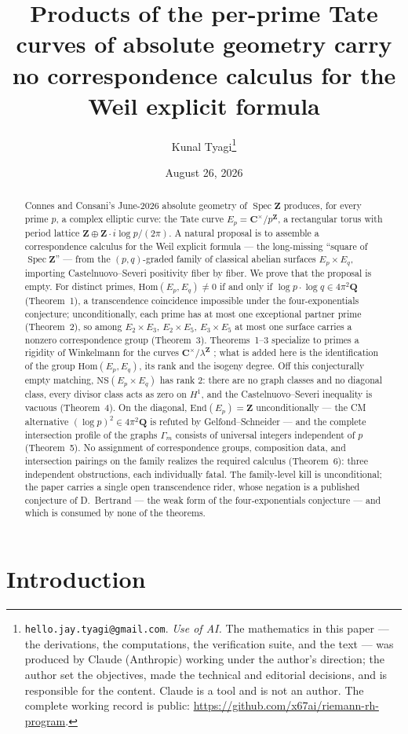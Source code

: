 \documentclass[11pt]{article}
\title{Products of the per-prime Tate curves of absolute geometry carry no
correspondence calculus for the Weil explicit formula}
\author{Kunal Tyagi\thanks{%
\texttt{hello.jay.tyagi@gmail.com}. \emph{Use of AI.} The mathematics in this
paper --- the derivations, the computations, the verification suite, and the
text --- was produced by Claude (Anthropic) working under the author's
direction; the author set the objectives, made the technical and editorial
decisions, and is responsible for the content. Claude is a tool and is not an
author. The complete working record is public:
\url{https://github.com/x67ai/riemann-rh-program}.}}
\date{August 26, 2026}
\theoremstyle{definition}
\theoremstyle{remark}
\newcommand{\Z}{\mathbf{Z}}
\newcommand{\Q}{\mathbf{Q}}
\newcommand{\C}{\mathbf{C}}
\newcommand{\NS}{\mathrm{NS}}
\newcommand{\Hom}{\mathrm{Hom}}
\newcommand{\End}{\mathrm{End}}
\newcommand{\SpecZ}{\operatorname{Spec}\Z}
\begin{document}
\maketitle

\begin{abstract}
Connes and Consani's June-2026 absolute geometry of $\SpecZ$ produces, for
every prime $p$, a complex elliptic curve: the Tate curve
$E_p = \C^\times/p^{\Z}$, a rectangular torus with period lattice
$\Z \oplus \Z\cdot i\log p/(2\pi)$. A natural proposal is to assemble a
correspondence calculus for the Weil explicit formula --- the long-missing
``square of $\SpecZ$'' --- from the $(p,q)$-graded family of classical abelian
surfaces $E_p \times E_q$, importing Castelnuovo--Severi positivity fiber by
fiber. We prove that the proposal is empty. For distinct primes,
$\Hom(E_p, E_q) \neq 0$ if and only if $\log p \cdot \log q \in 4\pi^2\Q$
(Theorem~1), a transcendence coincidence impossible under the
four-exponentials conjecture; unconditionally, each prime has at most one
exceptional partner prime (Theorem~2), so among $E_2\times E_3$,
$E_2\times E_5$, $E_3\times E_5$ at most one surface carries a nonzero
correspondence group (Theorem~3). Theorems~1--3 specialize to primes a
rigidity of Winkelmann for the curves $\C^\times/\lambda^{\Z}$ \cite{Wi04};
what is added here is the identification of the group $\Hom(E_p, E_q)$, its
rank and the isogeny degree. Off this conjecturally empty matching,
$\NS(E_p \times E_q)$ has rank $2$: there are no graph classes and no diagonal
class, every divisor class acts as zero on $H^1$, and the
Castelnuovo--Severi inequality is vacuous (Theorem~4). On the diagonal,
$\End(E_p) = \Z$ unconditionally --- the CM alternative
$(\log p)^2 \in 4\pi^2\Q$ is refuted by Gelfond--Schneider --- and the
complete intersection profile of the graphs $\Gamma_m$ consists of universal
integers independent of $p$ (Theorem~5). No assignment of correspondence
groups, composition data, and intersection pairings on the family realizes the
required calculus (Theorem~6): three independent obstructions, each
individually fatal. The family-level kill is unconditional; the paper carries a
single open transcendence rider, whose negation is a published conjecture of
D.~Bertrand --- the weak form of the four-exponentials conjecture --- and which
is consumed by none of the theorems.
\end{abstract}

\section{Introduction}
\label{sec:summary}
\end{document}

